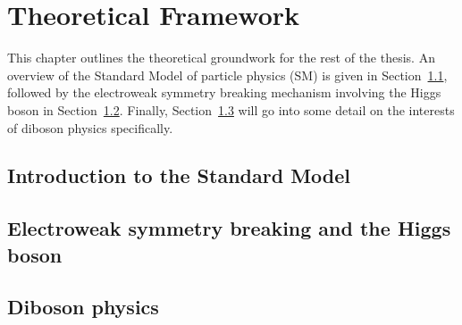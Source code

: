 \chapter[Theoretical Framework][Theoretical Framework]{Theoretical Framework} \label{ch:theory}

This chapter outlines the theoretical groundwork for the rest of the thesis.
An overview of the Standard Model of particle physics (SM) is given in Section~\ref{sec:theory_sm}, followed by the electroweak symmetry breaking mechanism involving the Higgs boson in Section~\ref{sec:theory_higgs}.
Finally, Section~\ref{sec:theory_diboson} will go into some detail on the interests of diboson physics specifically.

\section{Introduction to the Standard Model} \label{sec:theory_sm}


\section{Electroweak symmetry breaking and the Higgs boson} \label{sec:theory_higgs}


\section{Diboson physics}\label{sec:theory_diboson}

